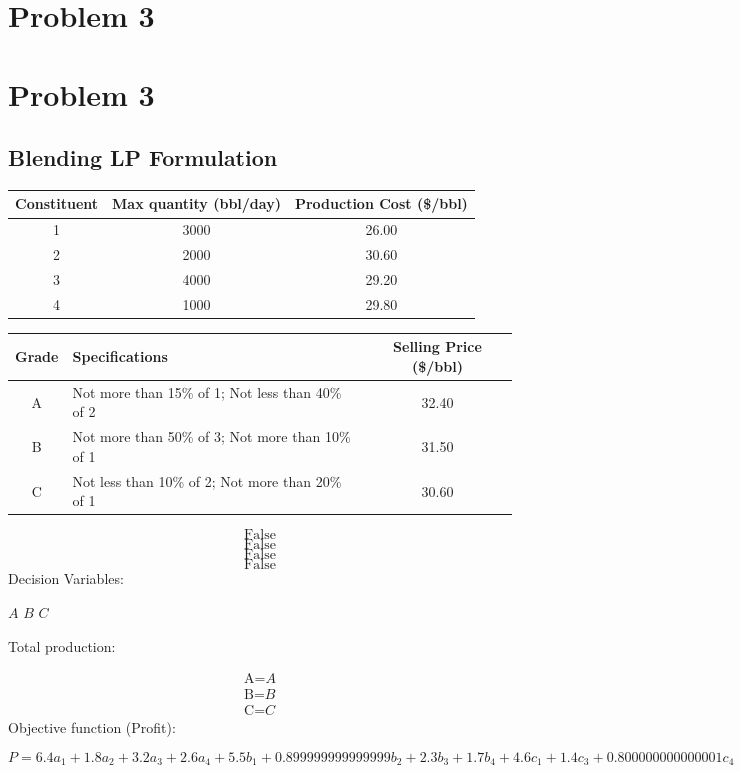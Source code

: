\documentclass{article}%
\begin{document}
%
\section*{Problem 3}%
\label{sec:Problem3}%

%
\section*{Problem 3}%
\label{sec:Problem3}%
\subsection*{Blending LP Formulation}%
\label{subsec:BlendingLPFormulation}%
\begin{table}[H]%
\centering%
\begin{tabular}{ccc}%
\hline%
Constituent&Max quantity (bbl/day)&Production Cost (\$/bbl)\\%
\hline%
1&3000&26.00\\%
\hline%
2&2000&30.60\\%
\hline%
3&4000&29.20\\%
\hline%
4&1000&29.80\\%
\hline%
\end{tabular}%
\end{table}%
\begin{table}[H]%
\centering%
\begin{tabular}{c p{4.5cm} c}%
\hline%
Grade&Specifications&Selling Price (\$/bbl)\\%
\hline%
A&Not more than 15\% of 1; Not less than 40\% of 2&32.40\\%
\hline%
B&Not more than 50\% of 3; Not more than 10\% of 1&31.50\\%
\hline%
C&Not less than 10\% of 2; Not more than 20\% of 1&30.60\\%
\hline%
\end{tabular}%
\end{table}%
\[%
\text{False}%
\]%
\[%
\text{False}%
\]%
\[%
\text{False}%
\]%
\[%
\text{False}%
\]%
Decision Variables:%
\par%
$A$%
$B$%
$C$%
\par%
Total production:%
\par%
\begin{align*}%
\text{A=}A \\%
\text{B=}B \\%
\text{C=}C%
\end{align*}%
Objective function (Profit):%
\par%
\[%
P = 6.4 a_{1} + 1.8 a_{2} + 3.2 a_{3} + 2.6 a_{4} + 5.5 b_{1} + 0.899999999999999 b_{2} + 2.3 b_{3} + 1.7 b_{4} + 4.6 c_{1} + 1.4 c_{3} + 0.800000000000001 c_{4}%
\]%
\end{document}
